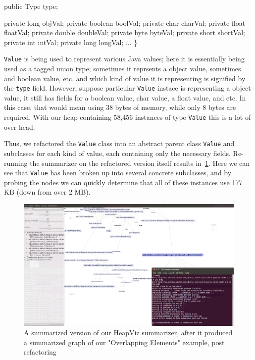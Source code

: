   public Type type;

  private long objVal;
  private boolean boolVal;
  private char charVal;
  private float floatVal;
  private double doubleVal;
  private byte byteVal;
  private short shortVal;
  private int intVal;
  private long longVal;
  ...
\}

\texttt{Value} is being used to represent various Java values; here it is
essentially being used as a tagged union type; sometimes it reprsents a
object value, sometimes and boolean value, etc. and which kind of value 
it is representing is signified by the \texttt{type} field. However, suppose
particular \texttt{Value} instace is representing a object value, it still
has fields for a boolean value,  char value, a float value, and etc. In this case,
that would mean using 38 bytes of memory, while only 8 bytes are required. With
our heap containing 58,456 instances of type \texttt{Value} this is a lot of over head. 

Thus, we refactored the \texttt{Value} class into an abstract parent class \texttt{Value} and subclasses for each kind of value, each containing only the necessary fields. Re-running the summarizer on the refactored version itself results in~\ref{fig:summarizer-post}. Here we can see that \texttt{Value} has been broken up into
several concrete subclasses, and by probing the nodes we can quickly determine
that all of these instances use 177 KB (down from over 2 MB). 


\begin{figure}[t]
  \includegraphics[width=\columnwidth]{figs/summarizer-post}
  \caption{A summarized version of our HeapViz summarizer, after it produced
	   a summarized graph of our "Overlapping Elements" example,
	   post refactoring}
  \label{fig:summarizer-post}
\end{figure}

 



